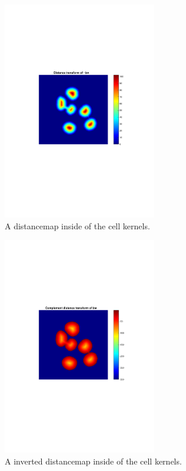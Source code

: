 \documentclass[10pt,twocolumn]{article}
\begin{document}
\begin{figure}[ht]
\centering
\includegraphics[width=0.6\textwidth]{Bilder/DistanceTransformInsideKernels.pdf}
\caption{A distancemap inside of the cell kernels.}
\label{fig:CellKernelsDist}
\end{figure}

\begin{figure}[ht]
\centering
\includegraphics[width=0.6\textwidth]{Bilder/InvertedDistanceMap.pdf}
\caption{A inverted distancemap inside of the cell kernels.}
\label{fig:CellKernelsDistInv}
\end{figure}
\end{document}
